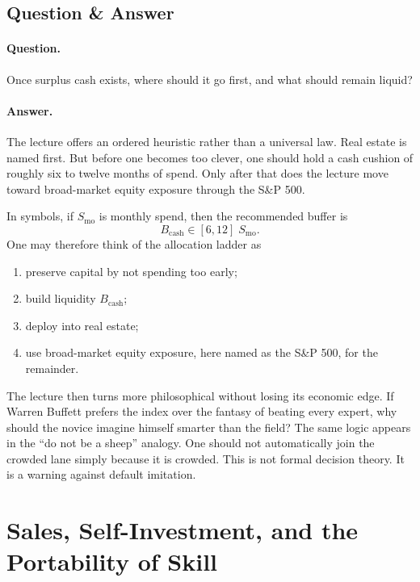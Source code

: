 \subsection{Question \& Answer}

\paragraph{Question.} Once surplus cash exists, where should it go first, and what should remain liquid?

\paragraph{Answer.} The lecture offers an ordered heuristic rather than a universal law. Real estate is named first. But before one becomes too clever, one should hold a cash cushion of roughly six to twelve months of spend. Only after that does the lecture move toward broad-market equity exposure through the S\&P 500.

In symbols, if \(S_{\mathrm{mo}}\) is monthly spend, then the recommended buffer is
\begin{equation}
B_{\mathrm{cash}} \in [6,12]\;S_{\mathrm{mo}}.
\end{equation}
One may therefore think of the allocation ladder as
\begin{enumerate}
\item preserve capital by not spending too early;
\item build liquidity \(B_{\mathrm{cash}}\);
\item deploy into real estate;
\item use broad-market equity exposure, here named as the S\&P 500, for the remainder.
\end{enumerate}

The lecture then turns more philosophical without losing its economic edge. If Warren Buffett prefers the index over the fantasy of beating every expert, why should the novice imagine himself smarter than the field? The same logic appears in the ``do not be a sheep'' analogy. One should not automatically join the crowded lane simply because it is crowded. This is not formal decision theory. It is a warning against default imitation.

\section{Sales, Self-Investment, and the Portability of Skill}

